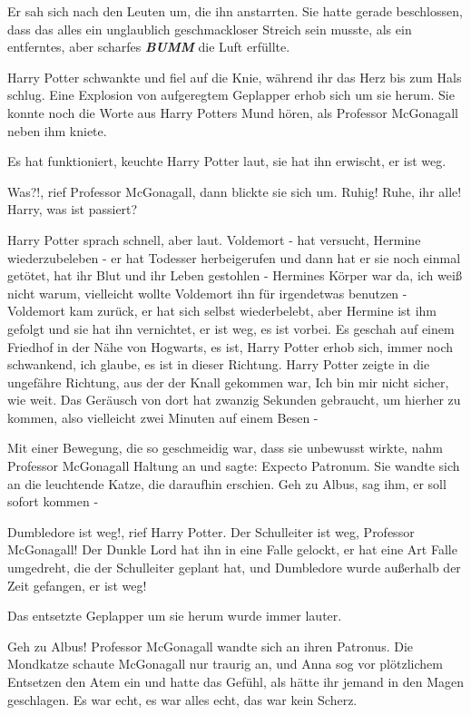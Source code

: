 Er sah sich nach den Leuten um, die ihn anstarrten. Sie hatte gerade
beschlossen, dass das alles ein unglaublich geschmackloser Streich sein musste,
als ein entferntes, aber scharfes \textbf{\emph{BUMM}} die Luft erfüllte.

Harry Potter schwankte und fiel auf die Knie, während ihr das Herz bis zum Hals
schlug. Eine Explosion von aufgeregtem Geplapper erhob sich um sie herum. Sie
konnte noch die Worte aus Harry Potters Mund hören, als Professor McGonagall
neben ihm kniete.

\glqq{}Es hat funktioniert\grqq{}, keuchte Harry Potter laut, \glqq{}sie hat ihn
erwischt, er ist weg.\grqq{}

\glqq{}Was?!\grqq{}, rief Professor McGonagall, dann blickte sie sich um. \glqq{}
Ruhig! Ruhe, ihr alle! Harry, was ist passiert?\grqq{}

Harry Potter sprach schnell, aber laut. \glqq{}Voldemort - hat versucht, Hermine
wiederzubeleben - er hat Todesser herbeigerufen und dann hat er sie noch einmal
getötet, hat ihr Blut und ihr Leben gestohlen - Hermines Körper war da, ich weiß
nicht warum, vielleicht wollte Voldemort ihn für irgendetwas benutzen -
Voldemort kam zurück, er hat sich selbst wiederbelebt, aber Hermine ist ihm
gefolgt und sie hat ihn vernichtet, er ist weg, es ist vorbei. Es geschah auf
einem Friedhof in der Nähe von Hogwarts, es ist\grqq{}, Harry Potter erhob sich,
immer noch schwankend, \glqq{}ich glaube, es ist in dieser Richtung.\grqq{} Harry
Potter zeigte in die ungefähre Richtung, aus der der Knall gekommen war, \glqq{}
Ich bin mir nicht sicher, wie weit. Das Geräusch von dort hat zwanzig Sekunden
gebraucht, um hierher zu kommen, also vielleicht zwei Minuten auf einem Besen -\grqq{}

Mit einer Bewegung, die so geschmeidig war, dass sie unbewusst wirkte, nahm
Professor McGonagall Haltung an und sagte: \glqq{}Expecto Patronum.\grqq{} Sie
wandte sich an die leuchtende Katze, die daraufhin erschien. \glqq{}Geh zu Albus,
sag ihm, er soll sofort kommen -\grqq{}

\glqq{}Dumbledore ist weg!\grqq{}, rief Harry Potter. \glqq{}Der Schulleiter ist
weg, Professor McGonagall! Der Dunkle Lord hat ihn in eine Falle gelockt, er hat
eine Art Falle umgedreht, die der Schulleiter geplant hat, und Dumbledore wurde
außerhalb der Zeit gefangen, er ist weg!\grqq{}

Das entsetzte Geplapper um sie herum wurde immer lauter.

\glqq{}Geh zu Albus!\grqq{} Professor McGonagall wandte sich an ihren Patronus.
Die Mondkatze schaute McGonagall nur traurig an, und Anna sog vor plötzlichem
Entsetzen den Atem ein und hatte das Gefühl, als hätte ihr jemand in den Magen
geschlagen. Es war echt, es war alles echt, das war kein Scherz.

